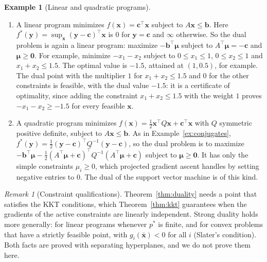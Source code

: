 \documentclass[11pt]{article}
\theoremstyle{definition}
\newtheorem{example}[definition]{Example}
\theoremstyle{plain}
\theoremstyle{remark}
\newtheorem{remark}[definition]{Remark}
\begin{document}
\begin{example}[Linear and quadratic programs]\label{ex:lp-qp}
    \begin{enumerate}
        \item A linear program minimizes $f(\mathbf{x}) = \mathbf{c}^\top\mathbf{x}$ subject to $A\mathbf{x} \leq \mathbf{b}$. Here $f^*(\mathbf{y}) = \sup_{\mathbf{x}}(\mathbf{y} - \mathbf{c})^\top\mathbf{x}$ is $0$ for $\mathbf{y} = \mathbf{c}$ and $\infty$ otherwise. So the dual problem is again a linear program: maximize $-\mathbf{b}^\top\boldsymbol{\mu}$ subject to $A^\top\boldsymbol{\mu} = -\mathbf{c}$ and $\boldsymbol{\mu} \geq \mathbf{0}$. For example, minimize $-x_1 - x_2$ subject to $0 \leq x_1 \leq 1$, $0 \leq x_2 \leq 1$ and $x_1 + x_2 \leq 1.5$. The optimal value is $-1.5$, attained at $(1, 0.5)$, for example. The dual point with the multiplier $1$ for $x_1 + x_2 \leq 1.5$ and $0$ for the other constraints is feasible, with the dual value $-1.5$: it is a certificate of optimality, since adding the constraint $x_1 + x_2 \leq 1.5$ with the weight $1$ proves $-x_1 - x_2 \geq -1.5$ for every feasible $\mathbf{x}$.
        \item A quadratic program minimizes $f(\mathbf{x}) = \frac{1}{2}\mathbf{x}^\top Q\mathbf{x} + \mathbf{c}^\top\mathbf{x}$ with $Q$ symmetric positive definite, subject to $A\mathbf{x} \leq \mathbf{b}$. As in Example~\ref{ex:conjugates}, $f^*(\mathbf{y}) = \frac{1}{2}(\mathbf{y} - \mathbf{c})^\top Q^{-1}(\mathbf{y} - \mathbf{c})$, so the dual problem is to maximize $-\mathbf{b}^\top\boldsymbol{\mu} - \frac{1}{2}(A^\top\boldsymbol{\mu} + \mathbf{c})^\top Q^{-1}(A^\top\boldsymbol{\mu} + \mathbf{c})$ subject to $\boldsymbol{\mu} \geq \mathbf{0}$. It has only the simple constraints $\mu_i \geq 0$, which projected gradient ascent handles by setting negative entries to $0$. The dual of the support vector machine is of this kind.
    \end{enumerate}
\end{example}

\begin{remark}[Constraint qualifications]
    Theorem~\ref{thm:duality} needs a point that satisfies the KKT conditions, which Theorem~\ref{thm:kkt} guarantees when the gradients of the active constraints are linearly independent. Strong duality holds more generally: for linear programs whenever $p^*$ is finite, and for convex problems that have a strictly feasible point, with $g_i(\bar{\mathbf{x}}) < 0$ for all $i$ (Slater's condition). Both facts are proved with separating hyperplanes, and we do not prove them here.
\end{remark}
\end{document}
